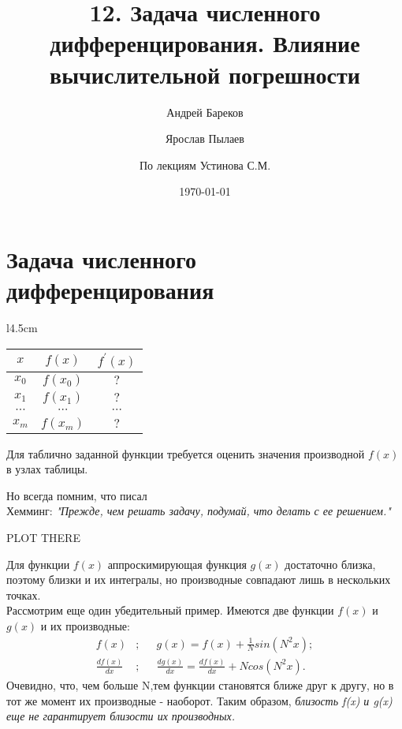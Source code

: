 \documentclass[a4paper,11pt]{article}
\title{12. Задача численного дифференцирования. Влияние вычислительной погрешности}
\author{Андрей Бареков \and Ярослав Пылаев \and По лекциям Устинова С.М.}
\date{\today}
\begin{document}
\maketitle
\newpage

\section{Задача численного дифференцирования}
\begin{minipage}{1\linewidth}
  \begin{wraptable}{l}{4.5cm}
    \begin{tabular}{ c|c|c }
      $x$ & $f(x)$ & $f^{'}(x)$ \\
      \hline
      $x_0$ & $f(x_0)$ & $?$ \\
      $x_1$ & $f(x_1)$ & $?$ \\
      $\cdots$ & $\cdots$ & $\cdots$ \\
      $x_m$ & $f(x_m)$ & $?$ \\
    \end{tabular}
  \end{wraptable}
  Для таблично заданной функции требуется оценить значения производной $f(x)$ в узлах таблицы.
  \begin{center}
    Но всегда помним, что писал \\
    Хемминг: \textit{"Прежде, чем решать задачу, подумай, что делать с ее решением."}
  \end{center}
\end{minipage}

\vspace{5mm}
\begin{center}
  PLOT THERE
\end{center}
Для функции $f(x)$ аппроскимирующая функция $g(x)$ достаточно близка, поэтому близки и их интегралы,
но производные совпадают лишь в нескольких точках.\\

Рассмотрим еще один убедительный пример. Имеются две функции $f(x)$ и $g(x)$ и их производные:
\begin{align*}
  f(x) &; & &g(x)=f(x)+\frac{1}{N}sin(N^2x); \\
  \frac{df(x)}{dx} &; & &\frac{dg(x)}{dx}=\frac{df(x)}{dx}+Ncos(N^2x).
\end{align*}
Очевидно, что, чем больше N,тем функции становятся ближе друг к другу, но в тот же момент их производные - наоборот.
Таким образом, \textit{близость f(x) и g(x) еще не гарантирует близости их производных.} \\
\end{document}
